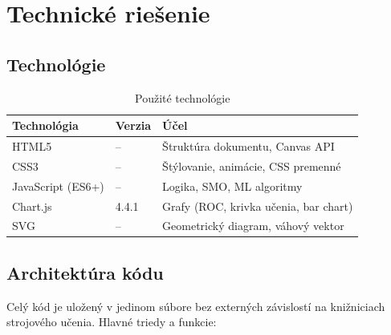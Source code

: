 \documentclass[12pt,a4paper]{article}
\begin{document}
\section{Technické riešenie}

\subsection{Technológie}

\begin{table}[H]
  \centering
  \caption{Použité technológie}
  \begin{tabular}{lll}
    \toprule
    \textbf{Technológia} & \textbf{Verzia} & \textbf{Účel} \\
    \midrule
    HTML5             & --      & Štruktúra dokumentu, Canvas API \\
    CSS3              & --      & Štýlovanie, animácie, CSS premenné \\
    JavaScript (ES6+) & --      & Logika, SMO, ML algoritmy \\
    Chart.js          & 4.4.1   & Grafy (ROC, krivka učenia, bar chart) \\
    SVG               & --      & Geometrický diagram, váhový vektor \\
    \bottomrule
  \end{tabular}
\end{table}

\subsection{Architektúra kódu}

Celý kód je uložený v jedinom súbore bez externých závislostí
na knižniciach strojového učenia. Hlavné triedy a funkcie:
\end{document}
